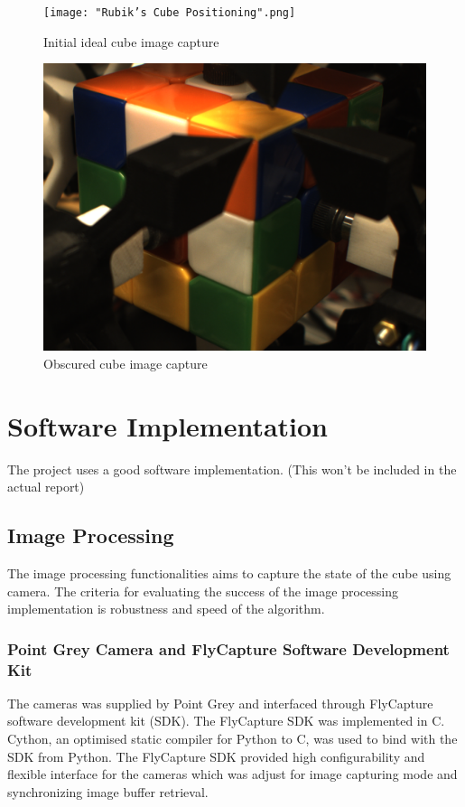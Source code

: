 \documentclass[final, letterpaper, 10 pt, conference, twocolumn]{IEEEtran}
\begin{document}
\begin{figure}[!ht]
\centering
\texttt{[image: "Rubik's Cube Positioning".png]}
\caption{Initial ideal cube image capture}
\label{fig:Camera Positioning}
\end{figure}

\begin{figure}[!ht]
\centering
\includegraphics[scale=0.15]{actual_cube_capture.png}
\caption{Obscured cube image capture}
\label{fig:Obscured Cube}
\end{figure}

\section{Software Implementation}
\label{sec:Software Implementation}

The project uses a good software implementation. (This won't be included in the actual report)

\subsection{Image Processing}
The image processing functionalities aims to capture the state of the cube using camera. The criteria for evaluating the success of the image processing implementation is robustness and speed of the algorithm.

\subsubsection{Point Grey Camera and FlyCapture Software Development Kit}
The cameras was supplied by Point Grey and interfaced through FlyCapture software development kit (SDK). The FlyCapture SDK was implemented in C. Cython, an optimised static compiler for Python to C, was used to bind with the SDK from Python.  The FlyCapture SDK  provided high configurability and flexible interface for the cameras which was adjust for image capturing mode and synchronizing image buffer retrieval. 
\end{document}
